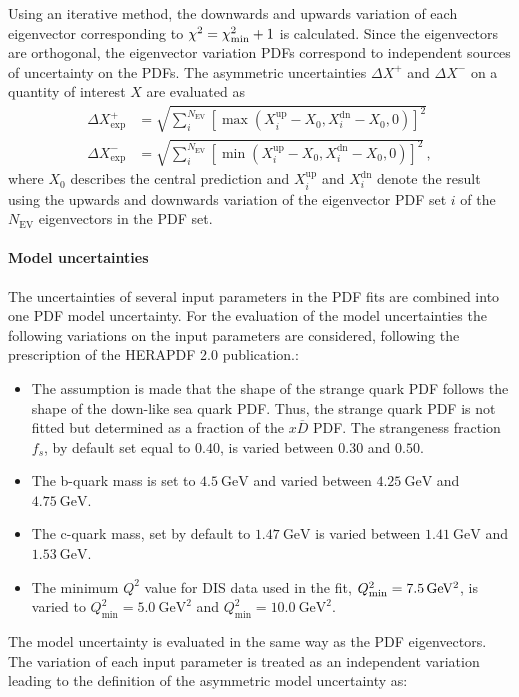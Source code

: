 Using an iterative method, the downwards and upwards variation of each
eigenvector corresponding to $\chi^2 = \chi^2_{\mathrm{min}} + 1$ is calculated.
Since the eigenvectors are orthogonal, the eigenvector variation PDFs correspond
to independent sources of uncertainty on the PDFs. The asymmetric uncertainties
$\Delta X^+$ and $\Delta X^-$ on a quantity of interest $X$ are evaluated as
%
\begin{align*}
  \Delta X^+_{\mathrm{exp}} &= \sqrt{\sum_i^{N_{\mathrm{EV}}} \left[ \max(X_i^{\mathrm{up}}
    -X_0, X_i^{\mathrm{dn}} - X_0, 0)\right]^2}\\
    \Delta X^-_{\mathrm{exp}} &= \sqrt{\sum_i^{N_{\mathrm{EV}}} \left[
    \min(X_i^{\mathrm{up}} - X_0, X_i^{\mathrm{dn}} - X_0,0)\right]^2}\,,
\end{align*}
%
where $X_0$ describes the central prediction and $X_i^{\mathrm{up}}$ and
$X_i^{\mathrm{dn}}$ denote the result using the upwards and downwards variation of
the eigenvector PDF set $i$ of the $N_{\mathrm{EV}}$ eigenvectors in the PDF set.

\paragraph{Model uncertainties} 
The uncertainties of several input parameters in
the PDF fits are combined into one PDF model uncertainty. For the evaluation of
the model uncertainties the following variations on the input parameters are
considered, following the prescription of the HERAPDF 2.0 publication.:
%
\begin{itemize}
\item The assumption is made that the shape of the strange quark PDF follows the
  shape of the down-like sea quark PDF. Thus, the strange quark PDF is not
  fitted but determined as a fraction of the $x\overline{D}$ PDF. The strangeness fraction
  $f_s$, by default set equal to $0.40$, is varied between $0.30$ and $0.50$.
  \item The b-quark mass is set to $\SI{4.5}{\GeV}$ and varied between
  $\SI{4.25}{\GeV}$ and $\SI{4.75}{\GeV}$.
  \item The c-quark mass, set by default to $\SI{1.47}{\GeV}$ is varied between
  $\SI{1.41}{\GeV}$ and $\SI{1.53}{\GeV}$.
  \item The minimum $Q^2$ value for DIS data used in the fit,
    $Q^2_\mathrm{min}=\SI{7.5}{\GeVsq}$, is varied to $Q^2_\mathrm{min} =
    \SI{5.0}{\GeV\squared}$ and $Q^2_\mathrm{min} = \SI{10.0}{\GeV\squared}$.
\end{itemize}
%
The model uncertainty is evaluated in the same way as the PDF eigenvectors.
The variation of each input parameter is treated as an independent variation
leading to the definition of the asymmetric model uncertainty as:

